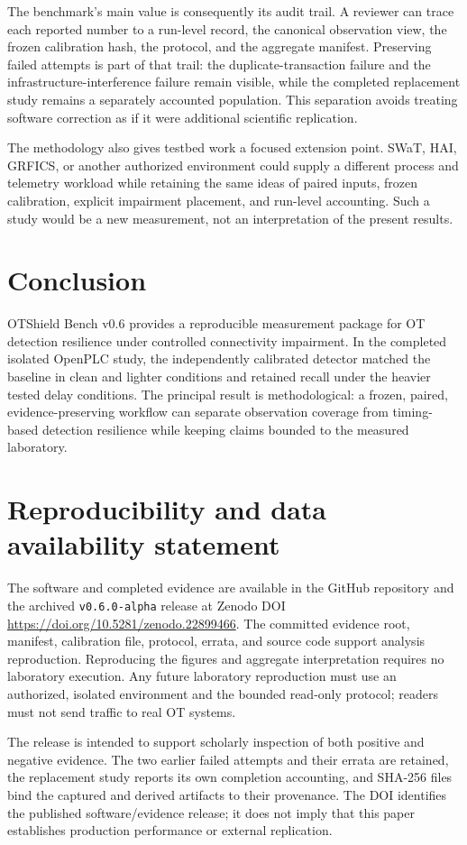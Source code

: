 \documentclass[11pt]{article}
\newcommand{\otb}{OTShield Bench}
\begin{document}
The benchmark's main value is consequently its audit trail. A reviewer can
trace each reported number to a run-level record, the canonical observation
view, the frozen calibration hash, the protocol, and the aggregate manifest.
Preserving failed attempts is part of that trail: the duplicate-transaction
failure and the infrastructure-interference failure remain visible, while the
completed replacement study remains a separately accounted population. This
separation avoids treating software correction as if it were additional
scientific replication.

The methodology also gives testbed work a focused extension point. SWaT, HAI,
GRFICS, or another authorized environment could supply a different process and
telemetry workload while retaining the same ideas of paired inputs, frozen
calibration, explicit impairment placement, and run-level accounting. Such a
study would be a new measurement, not an interpretation of the present results.

\section{Conclusion}
\otb{} v0.6 provides a reproducible measurement package for OT detection
resilience under controlled connectivity impairment. In the completed isolated
OpenPLC study, the independently calibrated detector matched the baseline in
clean and lighter conditions and retained recall under the heavier tested delay
conditions. The principal result is methodological: a frozen, paired,
evidence-preserving workflow can separate observation coverage from timing-based
detection resilience while keeping claims bounded to the measured laboratory.

\section{Reproducibility and data availability statement}
The software and completed evidence are available in the GitHub repository and
the archived \texttt{v0.6.0-alpha} release at Zenodo DOI
\url{https://doi.org/10.5281/zenodo.22899466}. The committed evidence root,
manifest, calibration file, protocol, errata, and source code support analysis
reproduction. Reproducing the figures and aggregate interpretation requires no
laboratory execution. Any future laboratory reproduction must use an authorized,
isolated environment and the bounded read-only protocol; readers must not send
traffic to real OT systems.

The release is intended to support scholarly inspection of both positive and
negative evidence. The two earlier failed attempts and their errata are retained,
the replacement study reports its own completion accounting, and SHA-256 files
bind the captured and derived artifacts to their provenance. The DOI identifies
the published software/evidence release; it does not imply that this paper
establishes production performance or external replication.




\appendix

\end{document}
